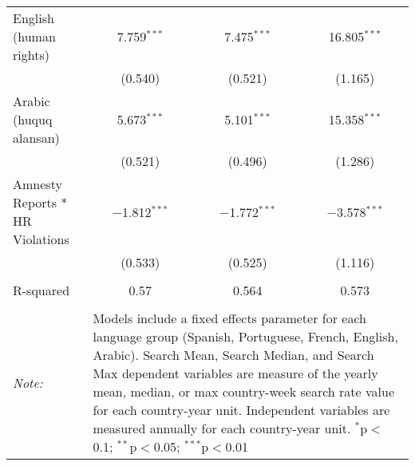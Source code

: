 \begin{table}[!htbp]
\begin{tabular}{@{\extracolsep{5pt}}lccc}
  English (human rights) & 7.759$^{***}$ & 7.475$^{***}$ & 16.805$^{***}$ \\ 
  & (0.540) & (0.521) & (1.165) \\ 
  Arabic (huquq alansan) & 5.673$^{***}$ & 5.101$^{***}$ & 15.358$^{***}$ \\ 
  & (0.521) & (0.496) & (1.286) \\ 
  Amnesty Reports * HR Violations & $-$1.812$^{***}$ & $-$1.772$^{***}$ & $-$3.578$^{***}$ \\ 
  & (0.533) & (0.525) & (1.116) \\ 
 \hline \\[-1.8ex] 
R-squared  & 0.57 & 0.564 & 0.573 \\ 
\hline 
\hline \\[-1.8ex] 
\textit{Note:}  & \multicolumn{3}{l}{\parbox[t]{8cm}{Models include a fixed effects parameter for each language group (Spanish, Portuguese, French, English, Arabic). Search Mean, Search Median, and Search Max dependent variables are measure of the yearly mean, median, or max country-week search rate value for each country-year unit. Independent variables are measured annually for each country-year unit. $^{*}$p$<$0.1; $^{**}$p$<$0.05; $^{***}$p$<$0.01}} \\ 
\end{tabular} 
\end{table} 
